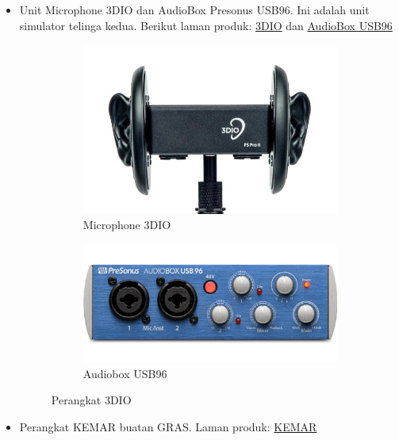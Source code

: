 \documentclass{article}
\begin{document}
\begin{itemize}
		\item Unit Microphone 3DIO dan AudioBox Presonus USB96. Ini adalah unit simulator telinga kedua.
		Berikut laman produk: \href{https://3diosound.com/products/free-space-pro-binaural-microphone}{3DIO}
		dan \href{https://www.frontendaudio.com/presonus-audiobox-usb-96-usb-audio-interface/}{AudioBox USB96}

		\begin{figure}[H]
			\centering
			\begin{subfigure}[]{.40\textwidth}
				\includegraphics[width=\textwidth]{images/3dio}
				\caption{Microphone 3DIO}
			\end{subfigure}
			\begin{subfigure}[]{.40\textwidth}
				\includegraphics[width=\textwidth]{images/audiobox}
				\caption{Audiobox USB96}
			\end{subfigure}
			\caption{Perangkat 3DIO}
		\end{figure}
	
		\item Perangkat KEMAR buatan GRAS.
		Laman produk: \href{https://www.grasacoustics.com/products/head-torso-simulators-kemar/product/733-45bb}{KEMAR}
		

\end{itemize}
\end{document}
